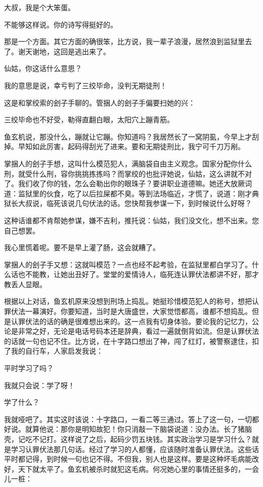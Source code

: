 大叔，我是个大笨蛋。 

不能够这样说。你的诗写得挺好的。 

那是一个方面。其它方面的确很笨，比方说，我一辈子浪漫，居然浪到监狱里去了。谢天谢地，这回是逃出来了。 

仙姑，你这话什么意思？ 

我的意思是说，幸亏判了三绞毕命，没判无期徒刑！ 

这是和掌绞索的刽子手聊的。管捆人的刽子手偏要扫她的兴： 

三绞毕命也不好受，勒得直翻白眼，太阳穴上蹦青筋。 

鱼玄机说，那没什么，蹦就让它蹦。你知道吗？我居然长了一窝阴虱，今早上才刮掉。早知如此厉害，起码得刮光了进来。要和无期徒刑比，我宁可千刀万剐。 

掌捆人的刽子手想，这叫什么模范犯人，满脑袋自由主义观念。国家分配你什么刑，就受什么刑，容你挑挑拣拣吗？而掌绞的也批评她说，仙姑，这么讲就不对了。我们收了你的钱，怎么会勒出你的眼珠子？要讲职业道德嘛。她还大放厥词道：监狱里的伙食，吃了以后拉屎都不臭。等到法场临近，才慌了，说道：刚才典狱长大叔说，临死该说几句伏法的话。您快帮我参谋一下，到时候说什么好呀？ 

这种话谁都不肯帮她参谋，嫌不吉利，推托说：仙姑，我们没文化，想不出来。您自己想罢。 

我心里慌着呢。要不是早上灌了肠，这会就糟了。 

掌捆人的刽子手又想：这就叫模范？一点也经不起考验，在监狱里都白学习了。什么话也不能教，让她出丑好了。堂堂的爱情诗人，临死连认罪伏法都讲不好，那才教丢人显眼。 

根据以上对话，鱼玄机原来没想到刑场上捣乱。她挺珍惜模范犯人的称号，想把认罪伏法一幕演好。你要知道，当时是大唐盛世，大家觉悟都高，谁都不想捣乱。但是认罪伏法的话的确是很难想出来的。这一点我有切身体验。要论我的记忆力，公论是非常之好，无论是电话号码本还是辞典，看过一遍就倒背如流。但是认罪伏法的话就一句也记不住。比方说，在十字路口想出了神，闯了红灯，被警察逮住，扣了我的自行车，人家启发我说： 

平时学习了吗？ 

我就只会说：学了呀！ 

学了什么？ 

我就哑吧了。其实这时该说：十字路口，一看二等三通过。答上了这一句，一切都好说。就算他说：那你是明知故犯！你只消敲一下脑袋说道：没办法。长了猪脑壳，记吃不记打。这样说了之后，起码少罚五块钱。其实政治学习是学习什么？就是学习认罪伏法那几句话。经过了学习的人都懂，应该随时准备认罪伏法。这些话平时都记得，到时候一句也记不得。不但我，别人也是这样。要是这种坏毛病能改好，天下就太平了。鱼玄机被杀时就犯这毛病。何况她心里的事情还挺多的，一会儿一桩： 

